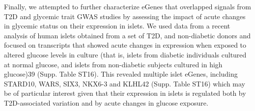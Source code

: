 Finally, we attempted to further characterize eGenes that overlapped signals from T2D and glycemic trait GWAS studies by assessing the impact of acute changes in glycemic status on their expression in islets. We used data from a recent analysis of human islets obtained from a set of T2D, and non-diabetic donors and focused on transcripts that showed acute changes in expression when exposed to altered glucose levels in culture (that is, islets from diabetic individuals cultured at normal glucose, and islets from non-diabetic subjects cultured in high glucose)39 (Supp. Table ST16). This revealed multiple islet eGenes, including STARD10, WARS, SIX3, NKX6-3 and KLHL42 (Supp. Table ST16) which may be of particular interest given that their expression in islets is regulated both by T2D-associated variation and by acute changes in glucose exposure.


